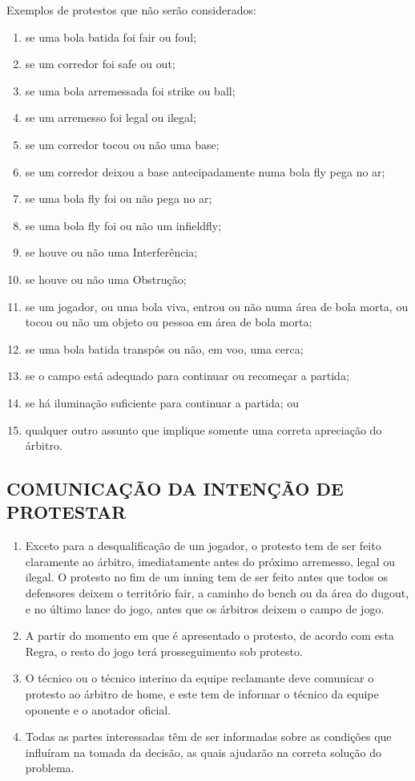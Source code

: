 Exemplos de protestos que não serão considerados:
\begin{exemplo}
	\begin{enumerate}[label=(\alph*), itemsep=.75mm]
		\item se uma bola batida foi \gls{fair} ou \gls{foul};
		\item  se um corredor foi \gls{safe} ou \gls{out};
		\item  se uma bola arremessada foi \gls{strike} ou \gls{ball};
		\item  se um arremesso foi legal ou ilegal;
		\item  se um corredor tocou ou não uma base;
		\item  se um corredor deixou a base antecipadamente numa bola \gls{fly} pega no ar;
		\item  se uma bola \gls{fly} foi ou não pega no ar;
		\item  se uma bola \gls{fly} foi ou não um \gls{infieldfly};
		\item  se houve ou não uma Interferência;
		\item  se houve ou não uma Obstrução;
		\item  se um jogador, ou uma bola viva, entrou ou não numa área de bola morta, ou tocou ou não um objeto ou pessoa em área de bola morta;
		\item  se uma bola batida transpôs ou não, em voo, uma cerca;
		\item  se o campo está adequado para continuar ou recomeçar a partida;
		\item  se há iluminação suficiente para continuar a partida; ou
		\item  qualquer outro assunto que implique somente uma correta apreciação do árbitro.
	\end{enumerate}
\end{exemplo}

\subsection{COMUNICAÇÃO DA INTENÇÃO DE PROTESTAR}
\begin{enumerate}[label=(\alph*)]
	\item  Exceto para a desqualificação de um jogador, o protesto tem de ser feito claramente ao árbitro, imediatamente antes do próximo arremesso, legal ou ilegal. O protesto no fim de um \gls{inning} tem de ser feito antes que todos os defensores deixem o território \gls{fair}, a caminho do \gls{bench} ou da área do \gls{dugout}, e no último lance do jogo, antes que os árbitros deixem o campo de jogo.
	\item  A partir do momento em que é apresentado o protesto, de acordo com esta Regra, o resto do jogo terá prosseguimento sob protesto.
	\item  O técnico ou o técnico interino da equipe reclamante deve comunicar o protesto ao árbitro de \gls{home}, e este tem de informar o técnico da equipe oponente e o anotador oficial.
	\item  Todas as partes interessadas têm de ser informadas sobre as condições que influíram na tomada da decisão, as quais ajudarão na correta solução do problema.
\end{enumerate}

